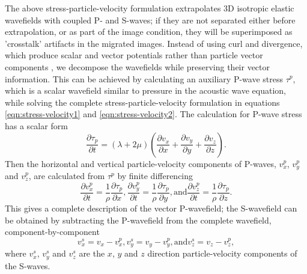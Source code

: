 \documentclass[manuscript,ulem,graphix,revised]{geophysics}
\begin{document}

The above stress-particle-velocity formulation extrapolates 3D isotropic elastic wavefields with coupled P- and S-waves; if they are not separated either before extrapolation, or as part of the image condition, they will be superimposed as 'crosstalk' artifacts in the migrated images. Instead of using curl and divergence, which produce scalar and vector potentials rather than particle vector components \citep{aki80,yan08}, we decompose the wavefields while preserving their vector information. This can be achieved by calculating an auxiliary P-wave stress $\tau^p$, which is a scalar wavefield similar to pressure in the acoustic wave equation, while solving the complete stress-particle-velocity formulation in equations \ref{eqn:stress-velocity1} and \ref{eqn:stress-velocity2}. The calculation for P-wave stress has a scalar form \citep{xiao10} 
\begin{equation}
\frac{\partial\tau_{p}}{\partial t}=(\lambda+2\mu)(\frac{\partial v_x}{\partial x}+\frac{\partial v_y}{\partial y}+\frac{\partial v_z}{\partial z}).
\label{eqn:tau-p}
\end{equation}
Then the horizontal and vertical particle-velocity components of P-waves, $v^p_{x}$, $v^p_{y}$ and $v^p_{z}$, are calculated from $\tau^p$ by finite differencing
\begin{subequations}
\begin{equation}
\frac{\partial v^p_{x}}{\partial t}=\frac{1}{\rho}\frac{\partial\tau _{p}}{\partial x},
\end{equation}
\begin{equation}
\frac{\partial v^p_{y}}{\partial t}=\frac{1}{\rho}\frac{\partial\tau _{p}}{\partial y},
\end{equation}
\text{and}
\begin{equation}
\frac{\partial v^p_{z}}{\partial t}=\frac{1}{\rho}\frac{\partial\tau _{p}}{\partial z}.
\end{equation}
\label{eqn:vp}
\end{subequations}
This gives a complete description of the vector P-wavefield; the S-wavefield can be obtained by subtracting the P-wavefield from the complete wavefield, component-by-component
\begin{subequations}
\begin{equation}
v^s_{x}=v_x-v^p_{x},
\end{equation}
\begin{equation}
v^s_{y}=v_y-v^p_{y},
\end{equation}
\text{and}
\begin{equation}
v^s_{z}=v_z-v^p_{z},
\end{equation}
\label{eqn:vs}
\end{subequations}
where $v^s_x$,  $v^s_y$ and $v^s_z$ are the $x$, $y$ and $z$ direction particle-velocity components of the S-waves. 
\end{document}
